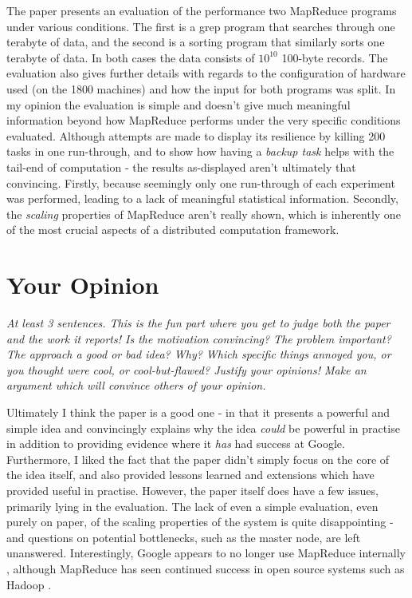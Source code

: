 \documentclass[11pt]{article}
\begin{document}
The paper presents an evaluation of the performance two MapReduce programs
under various conditions. The first is a grep program that searches through one
terabyte of data, and the second is a sorting program that similarly sorts one
terabyte of data. In both cases the data consists of $10^{10}$ 100-byte
records. The evaluation also gives further details with regards to the
configuration of hardware used (on the 1800 machines) and how the input for
both programs was split. In my opinion the evaluation is simple and doesn't
give much meaningful information beyond how MapReduce performs under the very
specific conditions evaluated. Although attempts are made to display its
resilience by killing 200 tasks in one run-through, and to show how having a
\textit{backup task} helps with the tail-end of computation - the results
as-displayed aren't ultimately that convincing. Firstly, because seemingly only
one run-through of each experiment was performed, leading to a lack of
meaningful statistical information. Secondly, the \textit{scaling} properties
of MapReduce aren't really shown, which is inherently one of the most crucial
aspects of a distributed computation framework.

\section*{Your Opinion}

\textsl{At least 3 sentences. This is the fun part where you get to judge both
the paper and the work it reports! Is the motivation convincing? The problem
important? The approach a good or bad idea? Why? Which specific things annoyed
you, or you thought were cool, or cool-but-flawed? Justify your opinions! Make
an argument which will convince others of your opinion.}

Ultimately I think the paper is a good one - in that it presents a powerful and
simple idea and convincingly explains why the idea \textit{could} be powerful
in practise in addition to providing evidence where it \textit{has} had success
at Google. Furthermore, I liked the fact that the paper didn't simply focus on
the core of the idea itself, and also provided lessons learned and extensions
which have provided useful in practise. However, the paper itself does have a
few issues, primarily lying in the evaluation. The lack of even a simple
evaluation, even purely on paper, of the scaling properties of the system is
quite disappointing - and questions on potential bottlenecks, such as the
master node, are left unanswered. Interestingly, Google appears to no longer
use MapReduce internally \cite{NoMoreMapReduce}, although MapReduce has seen
continued success in open source systems such as Hadoop \cite{Hadoop}.
\end{document}
